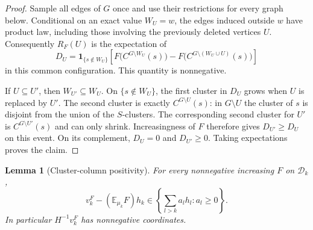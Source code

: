 \documentclass[11pt]{article}
\newtheorem{lemma}[theorem]{Lemma}
\theoremstyle{definition}
\begin{document}
\begin{proof}
Sample all edges of $G$ once and use their restrictions for every graph
below.  Conditional on an exact value $W_U=w$, the edges induced outside
$w$ have product law, including those involving the previously deleted
vertices $U$.  Consequently $R_F(U)$ is the expectation of
\[
 D_U=\mathbf1_{\{s\notin W_U\}}
 \left[F\bigl(C^{G\setminus W_U}(s)\bigr)
       -F\bigl(C^{G\setminus(W_U\cup U)}(s)\bigr)\right]
\]
in this common configuration.  This quantity is nonnegative.

If $U\subseteq U'$, then $W_{U'}\subseteq W_U$.  On
$\{s\notin W_U\}$, the first cluster in $D_U$ grows when $U$ is replaced
by $U'$.  The second cluster is exactly $C^{G\setminus U}(s)$: in
$G\setminus U$ the cluster of $s$ is disjoint from the union of the
$S$-clusters.  The corresponding second cluster for $U'$ is
$C^{G\setminus U'}(s)$ and can only shrink.  Increasingness of $F$
therefore gives $D_{U'}\ge D_U$ on this event.  On its complement,
$D_U=0$ and $D_{U'}\ge0$.  Taking expectations proves the claim.
\end{proof}

\begin{lemma}[Cluster-column positivity]
\label{lem:cluster-column}
For every nonnegative increasing $F$ on $\mathcal D_k$,
\begin{equation}
\label{eq:cluster-column}
 v_k^F-(\mathbb E_{\mu_k}F)h_k
       \in\left\{\sum_{l>k}a_lh_l:a_l\ge0\right\}.
\end{equation}
In particular $H^{-1}v_k^F$ has nonnegative coordinates.
\end{lemma}
\end{document}
